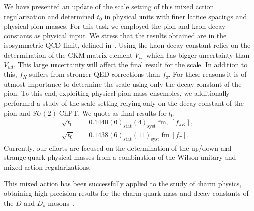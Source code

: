We have presented an update of the scale setting of this mixed action regularization and determined $t_0$ in physical units with finer lattice spacings and physical pion masses. For this task we employed the pion and kaon decay constants as physical input. We stress that the results obtained are in the isosymmetric QCD limit, defined in~\citep{FlavourLatticeAveragingGroupFLAG:2021npn}. 
Using the kaon decay constant relies on the determination of the CKM matrix element $V_{us}$ which has bigger uncertainty than $V_{ud}$. This large uncertainty will affect the final result for the scale. In addition to this, $f_K$ suffers from stronger QED corrections than $f_{\pi}$. For these reasons it is of utmost importance to determine the scale using only the decay constant of the pion. To this end, exploiting physical pion mass ensembles, we additionally performed a study of the scale setting relying only on the decay constant of the pion and $SU(2)$ ChPT. We quote as final results for $t_0$
\begin{align}
\sqrt{t_0}&=0.1440(6)_{\textrm{stat}}(4)_{\textrm{syst}}\;\textrm{fm},\;[f_{\pi K}],\\
\sqrt{t_0}&=0.1438(6)_{\textrm{stat}}(11)_{\textrm{syst}}\;\textrm{fm}\;[f_{\pi}].
\end{align}
Currently, our efforts are focused on the determination of the up/down and strange quark physical masses from a combination of the Wilson unitary and mixed action regularizations.

This mixed action has been successfully applied to the study of charm physics, obtaining high precision results for the charm quark mass and decay constants of the $D$ and $D_s$ mesons~\citep{charm}.

